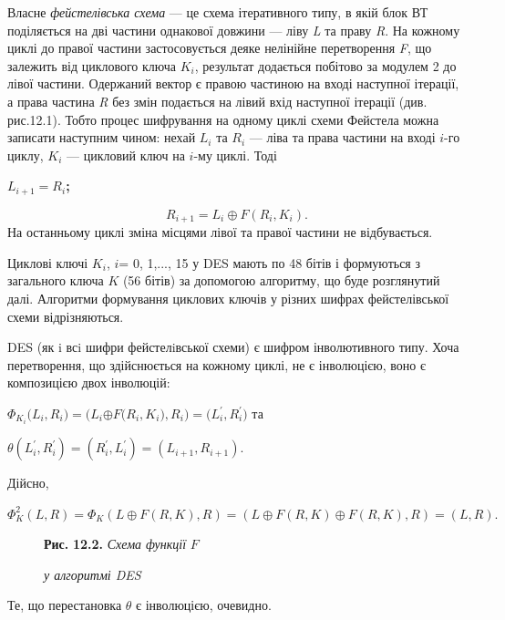  Власне \textit{фейстелівська схема} --- це схема ітеративного типу, в якій блок
ВТ поділяється на дві частини однакової довжини --- ліву \textit{L} та праву
\textit{R}. На кожному циклі до правої частини застосовується деяке нелінійне
перетворення \textit{F}, що залежить від циклового ключа  ${K_{{i}}}$,
результат додається побітово за модулем 2 до лівої частини. Одержаний вектор є
правою частиною на вході наступної ітерації, а права частина \textit{R}  без
змін подається на лівий вхід наступної ітерації (див. рис.12.1). Тобто процес
шифрування на одному циклі схеми Фейстела можна записати наступним чином: нехай
 ${L_{{i}}}$ та   ${R_{{i}}}$ --- ліва та права частини на вході  ${i}${}-го
циклу,  ${K_{{i}}}$ --- цикловий ключ на   ${i}${}-му циклі. Тоді

{\centering\bfseries
 ${L_{{i+1}}=R_{{i}}}$;
\par}

\begin{equation*}
{R_{{i+1}}=L_{{i}}{\oplus}F(R_{{i}},K_{{i}})\text{.}}
\end{equation*}
На останньому циклі зміна місцями лівої та правої частини не відбувається.

Циклові ключі  ${K_{{i}}}$,  ${i}$= 0, 1,..., 15 у DES мають по 48 бітів і
формуються з загального ключа  ${K}$ (56 бітів) за допомогою алгоритму, що буде
розглянутий далі. Алгоритми формування циклових ключів у різних шифрах
фейстелівської схеми відрізняються.

DES (як i всi шифри фейстелiвської схеми) є шифром  інволютивного типу. Хоча
перетворення, що здійснюється на кожному циклі, не є інволюцією, воно є
композицією  двох інволюцій:

{\centering
 ${\Phi
_{{K_{{i}}}}(L_{i}{,R_{i}}{)=(L_{i}}{{\oplus}F(R_{i}}{,K_{i}}{),R_{i}}{)=({L}_{i}^{'}}{,{R}_{i}^{'}}{)}}$\textbf{
 }та
\par}

{\centering
 ${\theta
({L}_{{i}}^{'},{R}_{{i}}^{'})=({R}_{{i}}^{'},{L}_{{i}}^{'})=(L_{{i+1}},R_{{i+1}})}$.
\par}

Дійсно,

 ${\Phi _{{K}}^{{2}}(L,R)=\Phi
_{{K}}(L{\oplus}F(R,K),R)=(L{\oplus}F(R,K){\oplus}F(R,K),R)=(L,R)\text{.}}$

\begin{figure}
\centering
\begin{minipage}{2.6445in}
{\centering
\textbf{Рис.}\textbf{ }\textbf{12.2.}\textbf{ }\textit{Схема функції } ${F}$
\par}

{\centering\itshape
у алгоритмі DES
\par}
\end{minipage}
\end{figure}
Те, що перестановка  ${\theta }$ є інволюцією, очевидно.

